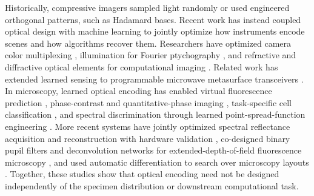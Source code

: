 \documentclass{optica-article}
\begin{document}
Historically, compressive imagers sampled light randomly or used engineered orthogonal patterns, such as Hadamard bases. Recent work has instead coupled optical design with machine learning to jointly optimize how instruments encode scenes and how algorithms recover them. Researchers have optimized camera color multiplexing \cite{chakrabarti2016learning}, illumination for Fourier ptychography \cite{cheng2019illumination,kellman2019data,sun2023unsupervised}, and refractive and diffractive optical elements for computational imaging \cite{sitzmann2018end,peng2019learned,sun2020end,sun2020diff}. Related work has extended learned sensing to programmable microwave
metasurface transceivers \cite{del2020learned}. In microscopy, learned optical encoding has enabled virtual fluorescence prediction \cite{cooke2021physics}, phase-contrast and quantitative-phase imaging \cite{diederich2018using,kellman2019physics}, task-specific cell classification \cite{chaware2020towards,horstmeyer2017convolutional,kim2020multi,muthumbi2019learned}, and spectral discrimination through learned point-spread-function engineering \cite{hershko2019multicolor}. More recent systems have jointly optimized spectral reflectance acquisition and reconstruction with hardware validation \cite{sha2025spectral}, co-designed binary pupil filters and deconvolution networks for extended-depth-of-field fluorescence microscopy \cite{seong2023e2e}, and used automatic differentiation to search over microscopy layouts \cite{rodriguez2024automated}. Together, these studies show that optical encoding need not be designed independently of the specimen distribution or downstream computational task.
\end{document}
